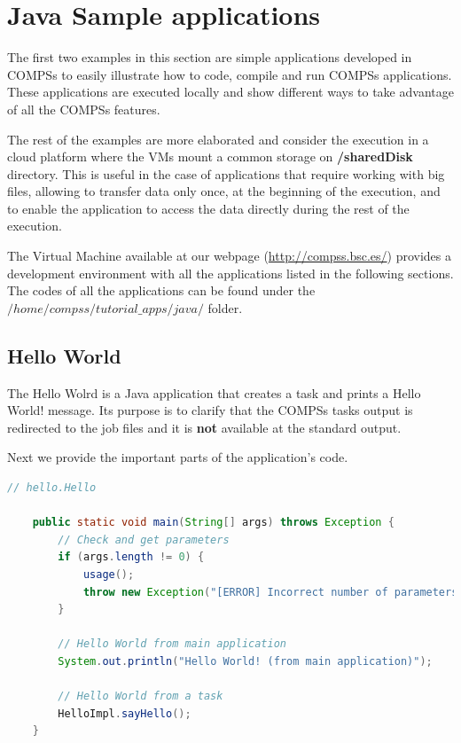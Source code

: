 \section{Java Sample applications}
\label{sec:JavaSampleApps}

The first two examples in this section are simple applications developed in COMPSs to easily illustrate how to code,
compile and run COMPSs applications. These applications are executed locally and show different ways to take advantage
of all the COMPSs features. 

The rest of the examples are more elaborated and consider the execution in a cloud platform where the VMs mount a common 
storage on \textbf{/sharedDisk} directory. This is useful in the case of applications that require working 
with big files, allowing to transfer data only once, at the beginning of the execution, and to enable 
the application to access the data directly during the rest of the execution.

The Virtual Machine available at our webpage (\url{http://compss.bsc.es/}) provides a development environment with
all the applications listed in the following sections. The codes of all the applications can be found under the 
$/home/compss/tutorial\_apps/java/$ folder. 

\subsection{Hello World}
The Hello Wolrd is a Java application that creates a task and prints a Hello World! message. Its purpose is to clarify that the 
COMPSs tasks output is redirected to the job files and it is \textbf{not} available at the standard output. 

Next we provide the important parts of the application's code.

\begin{lstlisting}[language=java]
	// hello.Hello
	
	public static void main(String[] args) throws Exception {
		// Check and get parameters
		if (args.length != 0) {
			usage();
			throw new Exception("[ERROR] Incorrect number of parameters");
		}
		
		// Hello World from main application
		System.out.println("Hello World! (from main application)");

		// Hello World from a task
		HelloImpl.sayHello();
	}
\end{lstlisting}


